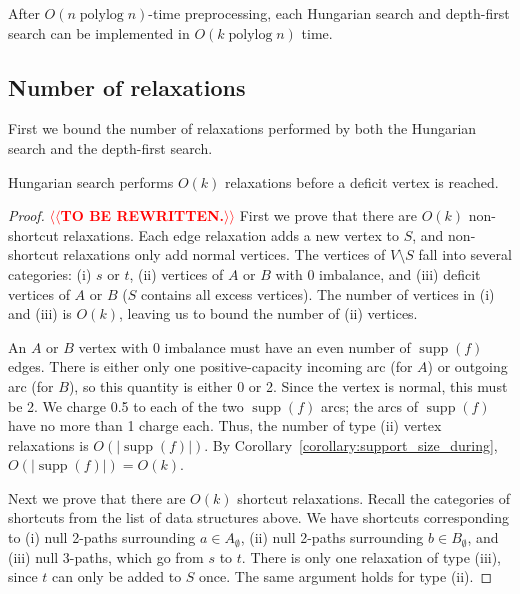 \documentclass[a4paper,UKenglish]{socg-lipics-v2018}
\makeatletter
\def\note#1{\textcolor{red}{{#1}}}
\def\polylog{\mathop{\mathrm{polylog}}}
\def\supp{\operatorname{supp}}
\theoremstyle{plain}
\numberwithin{figure}{section}
\def\n@te#1{\textsf{\boldmath \textbf{$\langle\!\langle$#1$\rangle\!\rangle$}}\leavevmode}
\def\note#1{\textcolor{red}{\n@te{#1}}}
\makeatother
\begin{document}
\begin{lemma}
After $O(n \polylog n)$-time preprocessing,
each Hungarian search and depth-first search can be implemented in $O(k \polylog n)$ time.
\end{lemma}


\begin{toappendix}
\subsection{Number of relaxations}
\label{SSA:num-relaxation}

First we bound the number of relaxations performed by both the Hungarian search and the depth-first search.

\begin{lemmarep}
\label{lemma:goldberg_hs_length}
Hungarian search performs $O(k)$ relaxations before a deficit vertex is reached.
\end{lemmarep}

\begin{proof}
\note{TO BE REWRITTEN.}
First we prove that there are $O(k)$ non-shortcut relaxations.
%
Each edge relaxation adds a new vertex to $S$, and non-shortcut relaxations
only add normal vertices.
The vertices of $V \setminus S$ fall into several categories:
(i) $s$ or $t$, (ii) vertices of $A$ or $B$ with 0 imbalance, and (iii)
deficit vertices of $A$ or $B$ ($S$ contains all excess vertices).
The number of vertices in (i) and (iii) is $O(k)$, leaving us to bound the
number of (ii) vertices.

An $A$ or $B$ vertex with $0$ imbalance must have an even number of $\supp(f)$
edges.
There is either only one positive-capacity incoming arc (for $A$) or outgoing
arc (for $B$), so this quantity is either 0 or 2.
Since the vertex is normal, this must be 2.
We charge 0.5 to each of the two $\supp(f)$ arcs; the arcs of $\supp(f)$
have no more than 1 charge each.
Thus, the number of type (ii) vertex relaxations is $O(|\supp(f)|)$.
By Corollary~\ref{corollary:support_size_during}, $O(|\supp(f)|) = O(k)$.

Next we prove that there are $O(k)$ shortcut relaxations.
%
Recall the categories of shortcuts from the list of data structures above.
We have shortcuts corresponding to (i) null 2-paths surrounding
$a \in A_\emptyset$, (ii) null 2-paths surrounding $b \in B_\emptyset$, and
(iii) null 3-paths, which go from $s$ to $t$.
%
There is only one relaxation of type (iii), since $t$ can only be added to $S$
once.
The same argument holds for type (ii).


\end{proof}
\end{toappendix}
\end{document}
